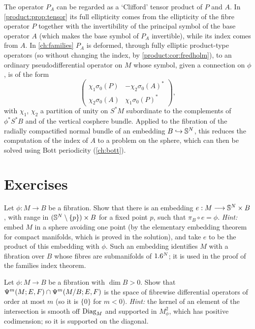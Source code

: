 The operator $P_A$ can be regarded as a `Clifford' tensor product of $P$ and $A$.
In \cref{product:prop:tensor} its full ellipticity comes from the ellipticity
of the fibre operator $P$ together with the invertibility of the principal symbol
of the base operator $A$ (which makes the base symbol of $P_A$ invertible), while
its index comes from $A$. In
\cref{ch:families} $P_A$ is deformed, through fully elliptic product-type operators
(so without changing the index, by \cref{product:cor:fredholm}), to an ordinary
pseudodifferential operator on $M$ whose symbol, given a connection on $\phi$, is
of the form
\begin{equation*}
\begin{pmatrix}\chi_1\sigma_0(P)&-\chi_2\sigma_0(A)^*\\
\chi_2\sigma_0(A)&\chi_1\sigma_0(P)^*\end{pmatrix},
\end{equation*}
with $\chi_1$, $\chi_2$ a partition of unity on $S^*M$ subordinate to the
complements of $\phi^*S^*B$ and of the vertical cosphere bundle. Applied to the
fibration of the radially compactified normal bundle of an embedding $B\hookrightarrow
\mathbb{S}^N$, this reduces the computation of the index of $A$ to a problem on the
sphere, which can then be solved using Bott periodicity (\cref{ch:bott}).

\section{Exercises}

\begin{exercise}\label{product:ex:embedding}
Let $\phi:M\longrightarrow B$ be a fibration. Show that there is an embedding
$e:M\longrightarrow\mathbb{S}^N\times B$, with range in
$(\mathbb{S}^N\setminus\{p\})\times B$ for a fixed point $p$, such that
$\pi_B\circ e=\phi$. \emph{Hint:} embed $M$ in a sphere avoiding one point
(by the elementary embedding theorem for compact manifolds, which is proved in
the solution), and take $e$ to be the product of this embedding with $\phi$. Such an
embedding identifies $M$ with a fibration over $B$ whose fibres are submanifolds
of $1.6^N$; it is used in the proof of the families index theorem.
\end{exercise}

\begin{exercise}\label{product:ex:intersection}
Let $\phi:M\longrightarrow B$ be a fibration with $\dim B>0$. Show that
$\Psi^{m}(M;E,F)\cap\Psi^{m}(M/B;E,F)$ is the space of fibrewise differential
operators of order at most $m$ (so it is $\{0\}$ for $m<0$). \emph{Hint:} the kernel
of an element of the intersection is smooth off $\operatorname{Diag}_M$ and supported in
$M^2_\phi$, which has positive codimension; so it is supported on the diagonal.
\end{exercise}

